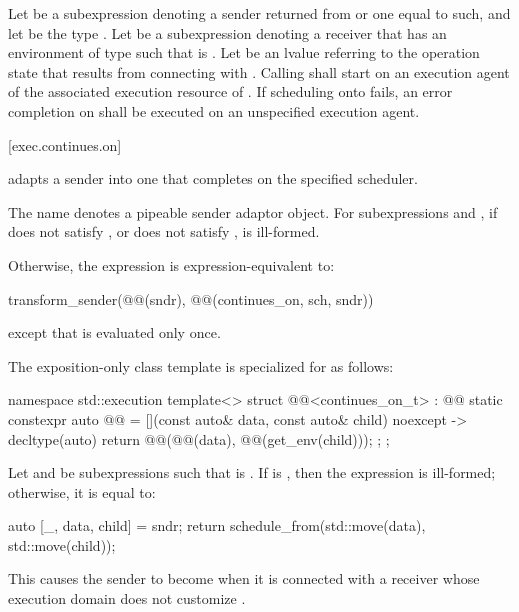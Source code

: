 \pnum
Let  be a subexpression denoting
a sender returned from  or one equal to such, and
let  be the type .
Let  be a subexpression denoting a receiver
that has an environment of type 
such that  is .
Let  be an lvalue referring to the operation state
that results from connecting  with .
Calling  shall start 
on an execution agent of the associated execution resource of .
If scheduling onto  fails,
an error completion on  shall be executed
on an unspecified execution agent.

[exec.continues.on]{}

\pnum
{} adapts a sender into one
that completes on the specified scheduler.

\pnum
The name  denotes a pipeable sender adaptor object.
For subexpressions  and ,
if  does not satisfy , or
 does not satisfy ,
 is ill-formed.

\pnum
Otherwise,
the expression  is expression-equivalent to:
\begin{codeblock}
transform_sender(@@(sndr), @@(continues_on, sch, sndr))
\end{codeblock}
except that  is evaluated only once.

\pnum
The exposition-only class template 
is specialized for  as follows:
\begin{codeblock}
namespace std::execution {
  template<>
  struct @@<continues_on_t> : @@ {
    static constexpr auto @@ =
      [](const auto& data, const auto& child) noexcept -> decltype(auto) {
        return @@(@@(data), @@(get_env(child)));
      };
  };
}
\end{codeblock}

\pnum
Let  and  be subexpressions
such that  is .
If  is ,
then
the expression  is ill-formed;
otherwise, it is equal to:
\begin{codeblock}
auto [_, data, child] = sndr;
return schedule_from(std::move(data), std::move(child));
\end{codeblock}
\begin{note}
This causes the  sender to become
 when it is connected with a receiver
whose execution domain does not customize .
\end{note}

